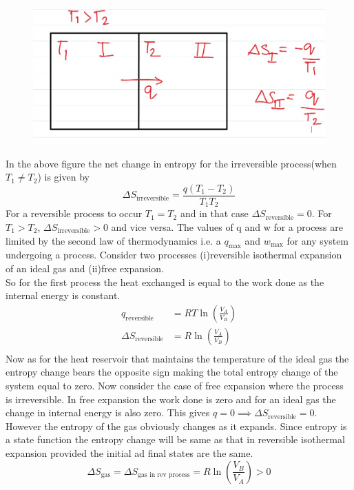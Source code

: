 \documentclass[12pt]{article}
\begin{document}
 \begin{figure}[h]
    \includegraphics[scale=0.5]{signofentropy.jpg}
    \centering
 \end{figure}
In the above figure the net change in entropy for the irreversible process(when $T_1\neq T_2$) is given by 
\begin{equation*}
	\Delta S_{\text{irreversible}}=\dfrac{q(T_1-T_2)}{T_1 T_2}
\end{equation*}
For a reversible process to occur $T_1=T_2$ and in that case $\Delta S_{\text{reversible}}=0$. For $T_1>T_2$, 	$\Delta S_{\text{irreversible}}>0$ and vice versa. The values of q and w for a process are limited by the second law of thermodynamics i.e. a $q_{\text{max}}$ and $w_{\text{max}}$ for any system undergoing a process. Consider two processes (i)reversible isothermal expansion of an ideal gas and (ii)free expansion. \\

So for the first process the heat exchanged is equal to the work done as the internal energy is constant. 
\begin{align*}
	q_{\text{reversible}}&=RT\ln(\frac{V_A}{V_B})\\
	\Delta S_{\text{reversible}}&=R\ln(\frac{V_A}{V_B})\\
\end{align*}
Now as for the heat reservoir that maintains the temperature of the ideal gas the entropy change bears the opposite sign making the total entropy change of the system equal to zero. Now consider the case of free expansion where the process is irreversible. In free expansion the work done is zero and for an ideal gas the change in internal energy is also zero. This gives $q=0\implies \Delta S_{\text{reversible}}=0$. However the entropy of the gas obviously changes as it expands. Since entropy is a state function the entropy change will be same as that in reversible isothermal expansion provided the initial ad final states are the same. 
\begin{equation}
	\boxed{\Delta S_{\text{gas}}=\Delta S_{\text{gas in rev process}}=R\ln(\frac{V_B}{V_A})>0}
\end{equation}
\end{document}
